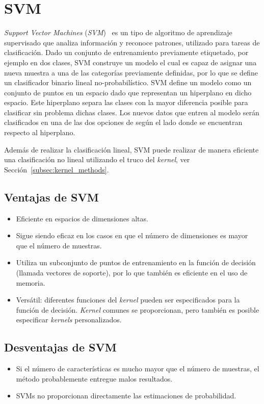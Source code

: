 \section{SVM}\label{sec:lsvm}

\textit{Support Vector Machines} (\textit{SVM})~\cite{Vapnik1995, Duda2000, Cortes1995} es un tipo de algoritmo de aprendizaje supervisado que analiza información y reconoce patrones, utilizado para tareas de clasificación. Dado un conjunto de entrenamiento previamente etiquetado, por ejemplo en dos clases, SVM construye un modelo el cual es capaz de asignar una nueva muestra a una de las categorías previamente definidas, por lo que se define un clasificador binario lineal no-probabilístico.
SVM define un modelo como un conjunto de puntos en un espacio dado que representan un hiperplano en dicho espacio. Este hiperplano separa las clases con la mayor diferencia posible para clasificar sin problema dichas clases. Los nuevos datos que entren al modelo serán clasificados en una de las dos opciones de según el lado donde se encuentran respecto al hiperplano.

Además de realizar la clasificación lineal, SVM puede realizar de manera eficiente una clasificación no lineal utilizando el truco del \textit{kernel}, ver Sección~\ref{subsec:kernel_methods}.%

\subsection{Ventajas de SVM}
\begin{itemize}
\item Eficiente en espacios de dimensiones altas.
\item Sigue siendo eficaz en los casos en que el número de dimensiones es mayor que el número de muestras.
\item Utiliza un subconjunto de puntos de entrenamiento en la función de decisión (llamada vectores de soporte), por lo que también es eficiente en el uso de memoria.
\item Versátil: diferentes funciones del \textit{kernel} pueden ser especificados para la función de decisión. \textit{Kernel} comunes se proporcionan, pero también es posible especificar \textit{kernels} personalizados.
\end{itemize}

\subsection{Desventajas de SVM}
\begin{itemize}
\item Si el número de características es mucho mayor que el número de muestras, el método probablemente entregue malos resultados.
\item SVMs no proporcionan directamente las estimaciones de probabilidad.
\end{itemize}

